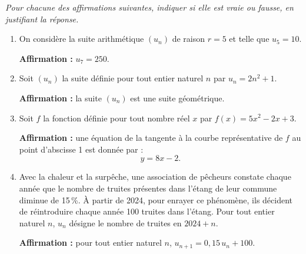 \emph{Pour chacune des affirmations suivantes, indiquer si elle est vraie ou fausse, en justifiant la réponse.}

\begin{enumerate}
	\item On considère la suite arithmétique $\left(u_n\right)$ de raison $r=5$ et telle que $u_5=10$.

	\textbf{Affirmation :} $u_7 = 250$.

	\item Soit $\left(u_n\right)$ la suite définie pour tout entier naturel $n$ par $u_n = 2n^2+1$.

	\textbf{Affirmation :} la suite $\left(u_n\right)$ est une suite géométrique.

	\item Soit $f$ la fonction définie pour tout nombre réel $x$ par $f(x) = 5x^2-2x+3$.

	\textbf{Affirmation :} une équation de la tangente à la courbe représentative de $f$ au point d'abscisse 1 est donnée par :
	\[y = 8x-2.\]

	\item Avec la chaleur et la surpêche, une association de pêcheurs constate chaque année que le nombre de truites présentes dans l'étang de leur commune diminue de 15\,\%. À partir de 2024, pour enrayer ce phénomène, ils décident de réintroduire chaque année 100 truites dans l'étang. Pour tout entier naturel $n$, $u_n$ désigne le nombre de truites en $2024+n$.

	\textbf{Affirmation :} pour tout entier naturel $n$, $u_{n+1} = 0,15\,u_n + 100$.
\end{enumerate}
